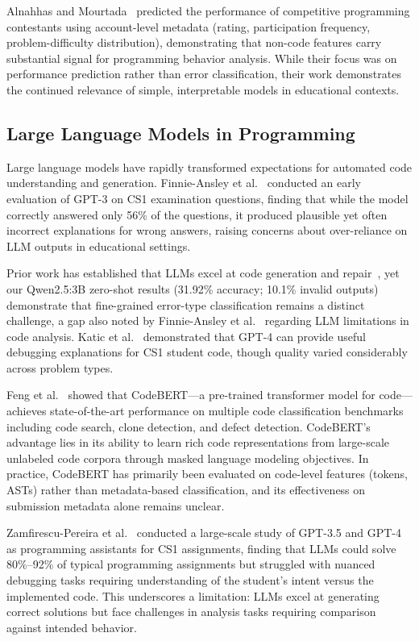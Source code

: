 \documentclass[acmsmall]{acmart}
\begin{document}
Alnahhas and Mourtada~\cite{alnahhas2020predicting} predicted the
performance of competitive programming contestants using account-level
metadata (rating, participation frequency, problem-difficulty distribution),
demonstrating that non-code features carry substantial signal for programming
behavior analysis. While their focus was on performance prediction rather than
error classification, their work demonstrates the continued relevance of simple,
interpretable models
in educational contexts.

\subsection{Large Language Models in Programming}

Large language models have rapidly transformed expectations for automated code
understanding and generation. Finnie-Ansley et
al.~\cite{finnie2022robots}
conducted an early evaluation of GPT-3 on CS1 examination questions, finding
that while the model correctly answered only 56\% of the questions, it
produced plausible yet often incorrect explanations for wrong answers,
raising concerns about over-reliance on LLM outputs in educational settings.

Prior work has established that LLMs excel at code generation and
repair~\cite{kazemitabaar2024impact}, yet our Qwen2.5:3B zero-shot results
(31.92\% accuracy; 10.1\% invalid outputs) demonstrate that fine-grained error-type classification remains a distinct
challenge, a gap also noted by Finnie-Ansley et
al.~\cite{finnie2022robots} regarding LLM limitations in code analysis. Katic
et al.~\cite{raihan2025large} demonstrated that GPT-4 can provide useful
debugging explanations for CS1 student code, though quality varied
considerably across problem types.

Feng et al.~\cite{feng2020codebert} showed that CodeBERT---a pre-trained
transformer model for code---achieves state-of-the-art performance on multiple
code classification benchmarks including code search, clone detection, and
defect detection. CodeBERT's advantage lies in its ability to learn rich code
representations from large-scale unlabeled code corpora through masked
language modeling objectives. In practice, CodeBERT has primarily been evaluated
on code-level features (tokens, ASTs) rather than metadata-based
classification, and its effectiveness on submission metadata alone remains
unclear.

Zamfirescu-Pereira et al.~\cite{zamfirescu2023what} conducted a large-scale
study of GPT-3.5 and GPT-4 as programming assistants for CS1 assignments,
finding that LLMs could solve 80\%--92\% of typical programming assignments
but struggled with nuanced debugging tasks requiring understanding of the
student's intent versus the implemented code. This underscores a
limitation: LLMs excel at generating correct solutions but face challenges in
analysis tasks requiring comparison against intended behavior.
\end{document}
